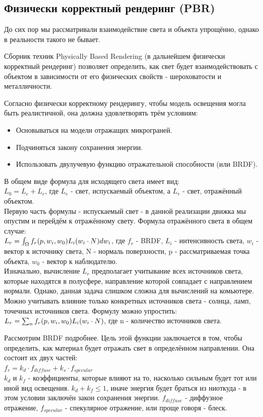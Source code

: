 \documentclass[a4paper,14pt]{extarticle}
\begin{document}
\subsection{Физически корректный рендеринг (PBR)}

До сих пор мы рассматривали взаимодействие света и 
объекта упрощённо, однако в реальности такого не бывает.

Сборник техник Physically Based Rendering (в дальнейшем физически корректный рендеринг) 
позволяет определить, как свет будет взаимодействовать с объектом в зависимости 
от его физических свойств - шероховатости и металличности.

Согласно физически корректному рендерингу, чтобы модель освещения могла быть реалистичной,
она должна удовлетворять трём условиям:
\begin{itemize}
    \item Основываться на модели отражащих микрограней.
    \item Подчиняться закону сохранения энергии.
    \item Использовать двулучевую функцию отражательной способности (или BRDF). 
\end{itemize}

В общем виде формула для исходящего света имеет вид:\\
$L_0 = L_e + L_r$, где $L_e$ - свет, испускаемый объектом, а $L_r$ - свет, отражённый объектом.\\
Первую часть формулы - испускаемый свет - в данной реализации движка мы опустим и перейдём к отражённому свету.
Формула отражённого света в общем случае:\\
$L_r = \int_{\Omega}^{} f_r(p, w_i, w_0) \space L_i \space (w_i \cdot N) dw_i$, где $f_r$ - BRDF, 
$L_i$ - интенсивность света, $w_i$ - вектор к источнику света, N - нормаль поверхности, p - рассматриваемая точка объекта, $w_0$ - вектор к наблюдателю.\\

Изначально, вычисление $L_r$ предполагает учитывание всех источников света, которые находятся в полусфере, 
направление которой совпадает с направлением нормали. Однако, данная задача слишком сложна для вычислений на комьютере. 
Можно учитывать влияние только конкретных источников света - солнца, ламп, точечных источников света. Формулу можно упростить:\\
$L_r = \sum_{n}^{} f_r(p, w_i, w_0) \space L_i \space (w_i \cdot N)$, где n - количество источников света.

Рассмотрим BRDF подробнее. Цель этой функции заключается в том, чтобы определить, как материал будет отражать свет в определённом направлении.
Она состоит их двух частей:\\
$f_r = k_d \cdot f_{diffuse} + k_s \cdot f_{specular}$\\
$k_d$ и $k_f$ - коэффициенты, которые влияют на то, насколько сильным будет тот или иной вид освещения. 
$k_d + k_f \leq 1$, иначе энергия будет браться из ниоткуда - в этом условии заключён закон сохранения энергии.
$f_{diffuse}$ - диффузное отражение, $f_{specular}$ - спекулярное отражение, или проще говоря - блеск.
\end{document}
